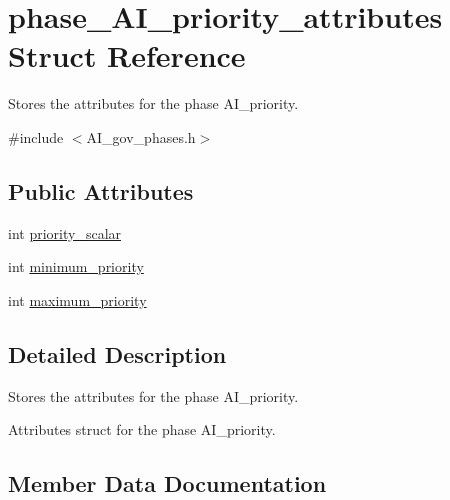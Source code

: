\hypertarget{structphase__AI__priority__attributes}{}\section{phase\+\_\+\+A\+I\+\_\+priority\+\_\+attributes Struct Reference}
\label{structphase__AI__priority__attributes}


Stores the attributes for the phase A\+I\+\_\+priority.  




{\ttfamily \#include $<$A\+I\+\_\+gov\+\_\+phases.\+h$>$}

\subsection*{Public Attributes}
\begin{DoxyCompactItemize}
\item 
int \hyperlink{structphase__AI__priority__attributes_a090c7eda71597fed95fee617ab6c256b}{priority\+\_\+scalar}
\item 
int \hyperlink{structphase__AI__priority__attributes_adc44b3832777cbe2198eaf47e716418d}{minimum\+\_\+priority}
\item 
int \hyperlink{structphase__AI__priority__attributes_a5efa1d1cba224f32272e1883f8e27384}{maximum\+\_\+priority}
\end{DoxyCompactItemize}


\subsection{Detailed Description}
Stores the attributes for the phase A\+I\+\_\+priority. 

Attributes struct for the phase A\+I\+\_\+priority. 

\subsection{Member Data Documentation}
\mbox{\label{structphase__AI__priority__attributes_a5efa1d1cba224f32272e1883f8e27384}} 
